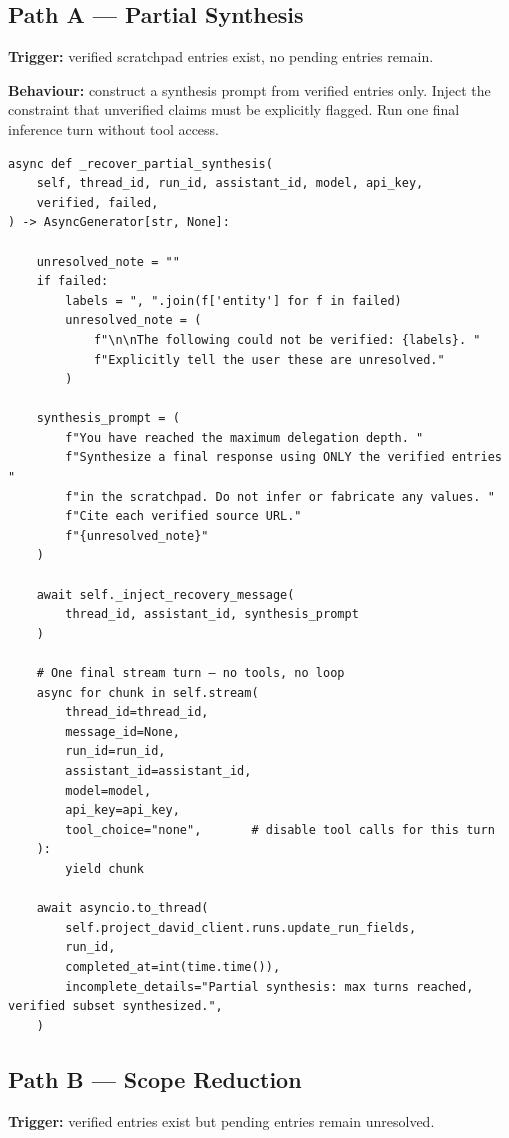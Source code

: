 \subsection*{Path A — Partial Synthesis}

\textbf{Trigger:} verified scratchpad entries exist, no pending entries remain.

\textbf{Behaviour:} construct a synthesis prompt from verified entries only.
Inject the constraint that unverified claims must be explicitly flagged.
Run one final inference turn without tool access.

\begin{verbatim}
async def _recover_partial_synthesis(
    self, thread_id, run_id, assistant_id, model, api_key,
    verified, failed,
) -> AsyncGenerator[str, None]:

    unresolved_note = ""
    if failed:
        labels = ", ".join(f['entity'] for f in failed)
        unresolved_note = (
            f"\n\nThe following could not be verified: {labels}. "
            f"Explicitly tell the user these are unresolved."
        )

    synthesis_prompt = (
        f"You have reached the maximum delegation depth. "
        f"Synthesize a final response using ONLY the verified entries "
        f"in the scratchpad. Do not infer or fabricate any values. "
        f"Cite each verified source URL."
        f"{unresolved_note}"
    )

    await self._inject_recovery_message(
        thread_id, assistant_id, synthesis_prompt
    )

    # One final stream turn — no tools, no loop
    async for chunk in self.stream(
        thread_id=thread_id,
        message_id=None,
        run_id=run_id,
        assistant_id=assistant_id,
        model=model,
        api_key=api_key,
        tool_choice="none",       # disable tool calls for this turn
    ):
        yield chunk

    await asyncio.to_thread(
        self.project_david_client.runs.update_run_fields,
        run_id,
        completed_at=int(time.time()),
        incomplete_details="Partial synthesis: max turns reached, verified subset synthesized.",
    )
\end{verbatim}

\subsection*{Path B — Scope Reduction}

\textbf{Trigger:} verified entries exist but pending entries remain unresolved.

